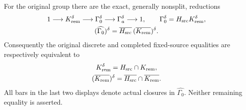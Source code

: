 For the original group there are the exact, generally nonsplit, reductions
\begin{equation}\label{eq:B139-kernel-reductions}
 \begin{gathered}
 1\longrightarrow K_{\rm rem}^{\delta}
 \longrightarrow\Gamma_0^\delta
 \longrightarrow\Gamma_a^\delta\longrightarrow1,\qquad
 \Gamma_0^\delta=H_{\rm src}K_{\rm rem}^\delta,\\
 (\widehat{\Gamma_0})^\delta
       =\overline{H_{\rm src}}\,(\overline{K_{\rm rem}})^\delta .
 \end{gathered}
\end{equation}
Consequently the original discrete and completed fixed-source equalities
are respectively equivalent to
\begin{equation}\label{eq:B139-remaining-gates}
 \begin{gathered}
 K_{\rm rem}^\delta=H_{\rm src}\cap K_{\rm rem},\\
 (\overline{K_{\rm rem}})^\delta
       =\overline{H_{\rm src}}\cap\overline{K_{\rm rem}}.
 \end{gathered}
\end{equation}
All bars in the last two displays denote actual closures in
$\widehat{\Gamma_0}$. Neither remaining equality is asserted.

